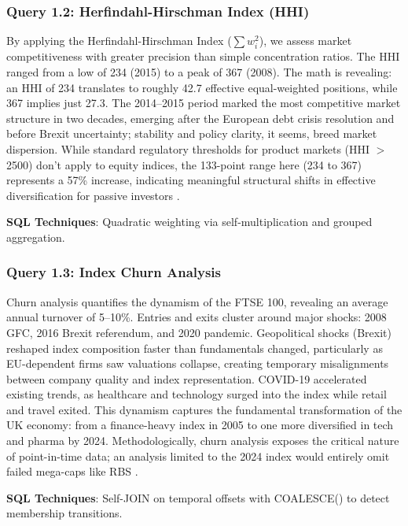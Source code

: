 \documentclass[10pt,a4paper]{article}
\begin{document}
\subsubsection{Query 1.2: Herfindahl-Hirschman Index (HHI)}
By applying the Herfindahl-Hirschman Index ($\sum w_i^2$), we assess market competitiveness with greater precision than simple concentration ratios. The HHI ranged from a low of 234 (2015) to a peak of 367 (2008). The math is revealing: an HHI of 234 translates to roughly 42.7 effective equal-weighted positions, while 367 implies just 27.3. The 2014--2015 period marked the most competitive market structure in two decades, emerging after the European debt crisis resolution and before Brexit uncertainty; stability and policy clarity, it seems, breed market dispersion. While standard regulatory thresholds for product markets (HHI $>$ 2500) don't apply to equity indices, the 133-point range here (234 to 367) represents a 57\% increase, indicating meaningful structural shifts in effective diversification for passive investors \cite{schwert1989,shiller1981}.

\textbf{SQL Techniques}: Quadratic weighting via self-multiplication and grouped aggregation.


\subsubsection{Query 1.3: Index Churn Analysis}
Churn analysis quantifies the dynamism of the FTSE 100, revealing an average annual turnover of 5--10\%. Entries and exits cluster around major shocks: 2008 GFC, 2016 Brexit referendum, and 2020 pandemic. Geopolitical shocks (Brexit) reshaped index composition faster than fundamentals changed, particularly as EU-dependent firms saw valuations collapse, creating temporary misalignments between company quality and index representation. COVID-19 accelerated existing trends, as healthcare and technology surged into the index while retail and travel exited. This dynamism captures the fundamental transformation of the UK economy: from a finance-heavy index in 2005 to one more diversified in tech and pharma by 2024. Methodologically, churn analysis exposes the critical nature of point-in-time data; an analysis limited to the 2024 index would entirely omit failed mega-caps like RBS \cite{rbs_ftse_exit}.

\textbf{SQL Techniques}: Self-JOIN on temporal offsets with COALESCE() to detect membership transitions.
\end{document}
